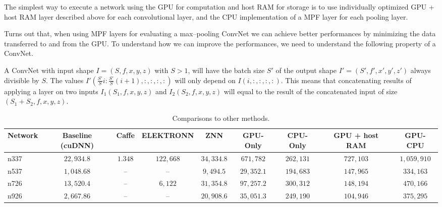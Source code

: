 \documentclass[conference]{./IEEEtran/IEEEtran}
\begin{document}
  The simplest way to execute a network using the GPU for computation
  and host RAM for storage is to use individually optimized GPU + host
  RAM layer described above for each convolutional layer, and the CPU
  implementation of a MPF layer for each pooling layer.

  Turns out that, when using MPF layers for evaluating a max--pooling
  ConvNet we can achieve better performances by minimizing the data
  transferred to and from the GPU.  To understand how we can improve
  the performances, we need to understand the following property of a
  ConvNet.

  A ConvNet with input shape $I = (S,f,x,y,z)$ with $S > 1$, will have
  the batch size $S'$ of the output shape $I' = (S',f',x',y',z')$
  always divisible by $S$.  The values $I'(\frac{S'}{S} i :
  \frac{S'}{S} (i+1),:,:,:,:)$ will only depend on $I(i,:,:,:,:)$.
  This means that concatenating results of applying a layer on two
  inputs $I_1(S_1,f,x,y,z)$ and $I_2(S_2,f,x,y,z)$ will equal to the
  result of the concatenated input of size $(S_1+S_2,f,x,y,z)$.

  \begin{table}[!htbp]
    { \footnotesize
    \centering
    \begin{tabular}{l|cccccccc}
      \toprule
      Network  & Baseline (cuDNN)  & Caffe    & ELEKTRONN   & ZNN         & GPU-Only    & CPU-Only    & GPU + host RAM & GPU-CPU   \\
      \midrule
      n337     & $22,934.8$        & $1.348$  & $122,668$   & $34,334.8$  & $671,782$   & $262,131$   & $727,103$      & $1,059,910$ \\
      n537     & $1,048.68$        & --       & --          & $9,494.5$   & $29,352.1$  & $194,683$   & $147,965$      & $334,163$ \\
      n726     & $13,520.4$        & --       & $6,122$     & $31,354.8$  & $97,257.2$  & $300,312$   & $148,194$      & $470,166$ \\
      n926     & $2,667.86$        & --       & --          & $20,908.6$  & $35,051.3$  & $249,190$   & $104,946$      & $375,295$ \\
      \bottomrule
    \end{tabular}
    \caption{Comparisons to other methods.}
    \label{table:comparisons_to_others}
  }
  \end{table}
\end{document}
